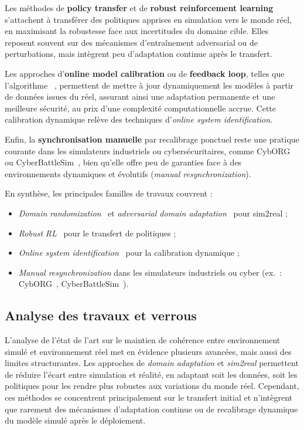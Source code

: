 Les méthodes de \textbf{policy transfer} et de \textbf{robust reinforcement learning}~\cite{pinto2017robust} s’attachent à transférer des politiques apprises en simulation vers le monde réel, en maximisant la robustesse face aux incertitudes du domaine cible. Elles reposent souvent sur des mécanismes d'entraînement adversarial ou de perturbations, mais intègrent peu d'adaptation continue après le transfert.

Les approches d’\textbf{online model calibration} ou de \textbf{feedback loop}, telles que l’algorithme ~\cite{deisenroth2011pilco}, permettent de mettre à jour dynamiquement les modèles à partir de données issues du réel, assurant ainsi une adaptation permanente et une meilleure sécurité, au prix d’une complexité computationnelle accrue. Cette calibration dynamique relève des techniques d’\textit{online system identification}.

Enfin, la \textbf{synchronisation manuelle} par recalibrage ponctuel reste une pratique courante dans les simulateurs industriels ou cybersécuritaires, comme CybORG~\cite{Standen2021} ou CyberBattleSim~\cite{cyberbattlesim}, bien qu’elle offre peu de garanties face à des environnements dynamiques et évolutifs (\textit{manual resynchronization}).

\medskip

En synthèse, les principales familles de travaux couvrent :
\begin{itemize}
  \item \textit{Domain randomization}~\cite{tobin2017domain} et \textit{adversarial domain adaptation}~\cite{ganin2016domain} pour sim2real ;
  \item \textit{Robust RL}~\cite{pinto2017robust} pour le transfert de politiques ;
  \item \textit{Online system identification}~\cite{deisenroth2011pilco} pour la calibration dynamique ;
  \item \textit{Manual resynchronization} dans les simulateurs industriels ou cyber (ex.~: CybORG~\cite{Standen2021}, CyberBattleSim~\cite{cyberbattlesim}).
\end{itemize}


\subsection*{Analyse des travaux et verrous}

L’analyse de l’état de l’art sur le maintien de cohérence entre environnement simulé et environnement réel met en évidence plusieurs avancées, mais aussi des limites structurantes. Les approches de \textit{domain adaptation} et \textit{sim2real} permettent de réduire l’écart entre simulation et réalité, en adaptant soit les données, soit les politiques pour les rendre plus robustes aux variations du monde réel. Cependant, ces méthodes se concentrent principalement sur le transfert initial et n’intègrent que rarement des mécanismes d’adaptation continue ou de recalibrage dynamique du modèle simulé après le déploiement.

